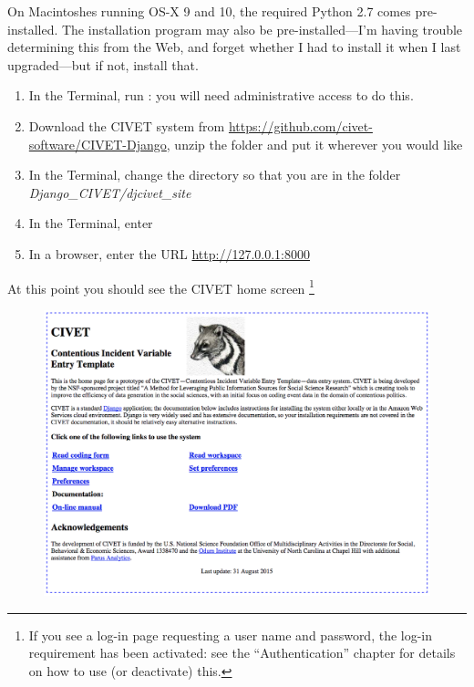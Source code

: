 \documentclass[letterpaper,10pt,english]{sphinxmanual}
\begin{document}
On Macintoshes running OS-X 9 and 10, the required Python 2.7 comes
pre-installed. The  installation program may also be
pre-installed—I’m having trouble determining this from the Web, and
forget whether I had to install it when I last upgraded—but if not,
install that.
\begin{enumerate}
\item {} 
In the Terminal, run : you will need
administrative access to do this.

\item {} 
Download the CIVET system from
\href{https://github.com/civet-software/CIVET-Django}{https://github.com/civet-software/CIVET-Django}, unzip the folder and
put it wherever you would like

\item {} 
In the Terminal, change the directory so that you are in the folder
\emph{Django\_CIVET/djcivet\_site}

\item {} 
In the Terminal, enter 

\item {} 
In a browser, enter the URL \href{http://127.0.0.1:8000}{http://127.0.0.1:8000}

\end{enumerate}

At this point you should see the CIVET home screen \footnote{
If you see a log-in page requesting a user name and password, the log-in requirement
has been activated: see the “Authentication” chapter for details on how to use
(or deactivate) this.
}
\begin{figure}[htbp]
\centering

\includegraphics[width=1.000\linewidth]{civethome.png}
\end{figure}
\end{document}
